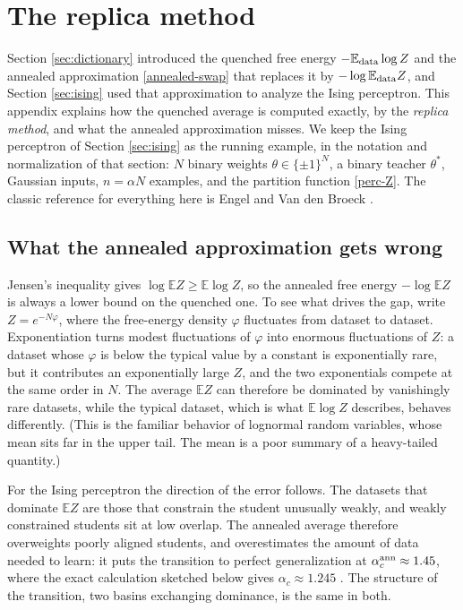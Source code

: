 \documentclass[11pt]{article}
\newcommand{\E}{\mathbb{E}}
\begin{document}
\section{The replica method}
\label{app:replica}

Section \ref{sec:dictionary} introduced the quenched free energy $-\E_{\rm data}\log Z$ and the annealed approximation \eqref{annealed-swap} that replaces it by $-\log\E_{\rm data}Z$, and Section \ref{sec:ising} used that approximation to analyze the Ising perceptron. This appendix explains how the quenched average is computed exactly, by the \emph{replica method}, and what the annealed approximation misses. We keep the Ising perceptron of Section \ref{sec:ising} as the running example, in the notation and normalization of that section: $N$ binary weights $\theta\in\{\pm1\}^N$, a binary teacher $\theta^*$, Gaussian inputs, $n=\alpha N$ examples, and the partition function \eqref{perc-Z}. The classic reference for everything here is Engel and Van den Broeck \cite{engel2001statistical}.

\subsection{What the annealed approximation gets wrong}
\label{app:annealed-correction}

Jensen's inequality gives $\log\E Z\geq\E\log Z$, so the annealed free energy $-\log\E Z$ is always a lower bound on the quenched one. To see what drives the gap, write $Z = e^{-N\varphi}$, where the free-energy density $\varphi$ fluctuates from dataset to dataset. Exponentiation turns modest fluctuations of $\varphi$ into enormous fluctuations of $Z$: a dataset whose $\varphi$ is below the typical value by a constant is exponentially rare, but it contributes an exponentially large $Z$, and the two exponentials compete at the same order in $N$. The average $\E Z$ can therefore be dominated by vanishingly rare datasets, while the typical dataset, which is what $\E\log Z$ describes, behaves differently. (This is the familiar behavior of lognormal random variables, whose mean sits far in the upper tail. The mean is a poor summary of a heavy-tailed quantity.)

For the Ising perceptron the direction of the error follows. The datasets that dominate $\E Z$ are those that constrain the student unusually weakly, and weakly constrained students sit at low overlap. The annealed average therefore overweights poorly aligned students, and overestimates the amount of data needed to learn: it puts the transition to perfect generalization at $\alpha_c^{\rm ann}\approx1.45$, where the exact calculation sketched below gives $\alpha_c\approx1.245$ \cite{gyorgyi1990first}. The structure of the transition, two basins exchanging dominance, is the same in both.
\end{document}
